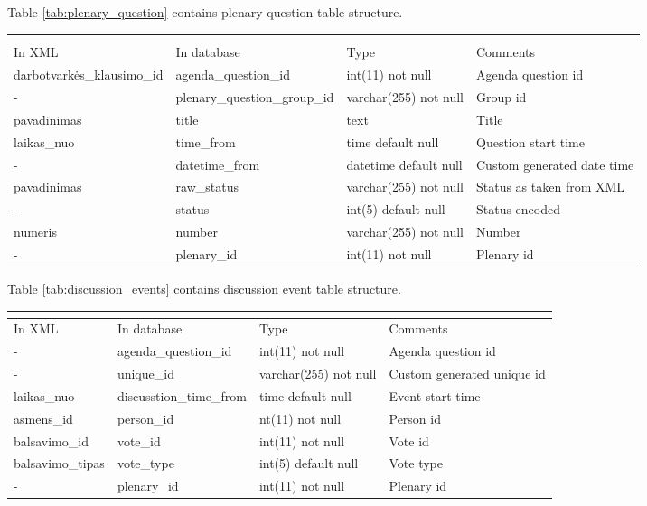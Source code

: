 \documentclass[a4paper,12pt]{article}
\begin{document}
	\noindent
	Table \ref{tab:plenary_question} contains plenary question table structure.
	\begin{center}
		\begin{tabular}{L{3cm} L{4.2cm} L{3cm} L{2.5cm}}
			\\ 
			\hline
			In XML & In database & Type & Comments\\
			\hline
			darbotvarkės\_klausimo\_id & agenda\_question\_id & int(11) not null & Agenda question id\\
			- & plenary\_question\_group\_id & varchar(255) not null & Group id\\
			pavadinimas & title & text & Title \\
			laikas\_nuo & time\_from & time default null &  Question start time \\
				- & datetime\_from & datetime default null & Custom generated date time \\
			pavadinimas & raw\_status & varchar(255) not null & Status as taken from XML \\
			- & status & int(5) default null & Status encoded \\
			numeris & number & varchar(255) not null & Number \\
			- & plenary\_id & int(11) not null & Plenary id\\				                                    
			\hline
		\end{tabular}
		 \label{tab:plenary_question}
	\end{center}
	
	\hfill
	
		\noindent
	Table \ref{tab:discussion_events} contains discussion event table structure.
	\begin{center}
		\begin{tabular}{L{3cm} L{4.2cm} L{3cm} L{2.5cm}}
			\\ 
			\hline
			In XML & In database & Type & Comments\\
			\hline
			- & agenda\_question\_id & int(11) not null & Agenda question id\\
			- & unique\_id & varchar(255) not null & Custom generated unique id\\
			laikas\_nuo & discusstion\_time\_from & time default null &  Event start time \\
			asmens\_id & person\_id & nt(11) not null & Person id\\
			balsavimo\_id & vote\_id & int(11) not null & Vote id\\
			balsavimo\_tipas & vote\_type & int(5) default null & Vote type \\
			- & plenary\_id & int(11) not null & Plenary id\\				                                    
			\hline
		\end{tabular}
		 \label{tab:discussion_events}
	\end{center}
\end{document}

